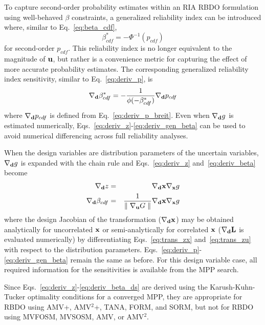 To capture second-order probability estimates within an RIA RBDO
formulation using well-behaved $\beta$ constraints, a generalized 
reliability index can be introduced where, similar to Eq.~\ref{eq:beta_cdf},
\begin{equation}
\beta^*_{cdf} = -\Phi^{-1}(p_{cdf}) \label{eq:gen_beta}
\end{equation}
for second-order $p_{cdf}$.  This reliability index is no longer
equivalent to the magnitude of ${\bf u}$, but rather is a convenience
metric for capturing the effect of more accurate probability
estimates.  The corresponding generalized reliability index
sensitivity, similar to Eq.~\ref{eq:deriv_p}, is
\begin{equation}
\nabla_{\bf d} \beta^*_{cdf} = -\frac{1}{\phi(-\beta^*_{cdf})}
\nabla_{\bf d} p_{cdf} \label{eq:deriv_gen_beta}
\end{equation}
where $\nabla_{\bf d} p_{cdf}$ is defined from Eq.~\ref{eq:deriv_p_breit}.
Even when $\nabla_{\bf d} g$ is estimated numerically,
Eqs.~\ref{eq:deriv_z}-\ref{eq:deriv_gen_beta} can be used to avoid
numerical differencing across full reliability analyses.

When the design variables are distribution parameters of the uncertain
variables, $\nabla_{\bf d} g$ is expanded with the chain rule and
Eqs.~\ref{eq:deriv_z} and~\ref{eq:deriv_beta} become
\begin{eqnarray}
\nabla_{\bf d} z           & = & \nabla_{\bf d} {\bf x} \nabla_{\bf x} g
\label{eq:deriv_z_ds} \\
\nabla_{\bf d} \beta_{cdf} & = & \frac{1}{{\parallel \nabla_{\bf u} G 
\parallel}} \nabla_{\bf d} {\bf x} \nabla_{\bf x} g \label{eq:deriv_beta_ds}
\end{eqnarray}
where the design Jacobian of the transformation ($\nabla_{\bf d} {\bf x}$)
may be obtained analytically for uncorrelated ${\bf x}$ or 
semi-analytically for correlated ${\bf x}$ ($\nabla_{\bf d} {\bf L}$
is evaluated numerically) by differentiating Eqs.~\ref{eq:trans_zx} 
and~\ref{eq:trans_zu} with respect to the distribution parameters.
Eqs.~\ref{eq:deriv_p}-\ref{eq:deriv_gen_beta} remain the same as
before.  For this design variable case, all required information for 
the sensitivities is available from the MPP search.

Since Eqs.~\ref{eq:deriv_z}-\ref{eq:deriv_beta_ds} are derived using
the Karush-Kuhn-Tucker optimality conditions for a converged MPP, they
are appropriate for RBDO using AMV+, AMV$^2$+, TANA, FORM, and SORM,
but not for RBDO using MVFOSM, MVSOSM, AMV, or AMV$^2$.


